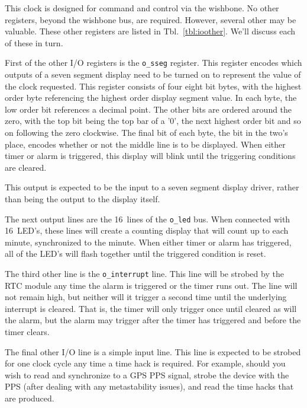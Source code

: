 \documentclass{gqtekspec}
\begin{document}
This clock is designed for command and control via the wishbone.  No other
registers, beyond the wishbone bus, are required.  However, several other
may be valuable.  These other registers are listed in Tbl.~\ref{tbl:ioother}. 
We'll discuss each of these in turn.

First of the other I/O registers is the {\tt o\_sseg} register.  This register
encodes which outputs of a seven segment display need to be turned on to
represent the value of the clock requested.  This register consists of four
eight bit bytes, with the highest order byte referencing the highest order
display segment value.  In each byte, the low order bit references a decimal
point.  The other bits are ordered around the zero, with the top bit being
the top bar of a '0', the next highest order bit and so on following the
zero clockwise.  The final bit of each byte, the bit in the two's place, 
encodes whether or not the middle line is to be displayed.  When either timer
or alarm is triggered, this display will blink until the triggering conditions
are cleared.

This output is expected to be the input to a seven segment display driver,
rather than being the output to the display itself.

The next output lines are the 16~lines of the {\tt o\_led} bus.  When connected
with 16~LED's, these lines will create a counting display that will count up
to each minute, synchronized to the minute.  When either timer or alarm has
triggered, all of the LED's will flash together until the triggered condition
is reset.

The third other line is the {\tt o\_interrupt} line.  This line will be 
strobed by the RTC module any time the alarm is triggered or the timer runs
out.  The line will not remain high, but neither will it trigger a second
time until the underlying interrupt is cleared.  That is, the timer will only
trigger once until cleared as will the alarm, but the alarm may trigger after
the timer has triggered and before the timer clears.

The final other I/O line is a simple input line.  This line is expected to be
strobed for one clock cycle any time a time hack is required.  For example,
should you wish to read and synchronize to a GPS PPS signal, strobe the device
with the PPS (after dealing with any metastability issues), and read the time
hacks that are produced.

\end{document}
